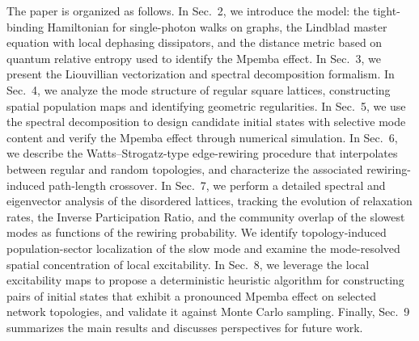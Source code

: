 \documentclass[pdflatex,sn-mathphys-num]{sn-jnl}
\renewcommand{\textcolor}[2]{#2}
\begin{document}
The paper is organized as follows.
In Sec.~2, we introduce the model: the tight-binding Hamiltonian
for single-photon walks on graphs, the Lindblad master equation
with local dephasing dissipators, and the distance metric based on
quantum relative entropy used to identify the Mpemba effect.
In Sec.~3, we present the Liouvillian vectorization and spectral
decomposition formalism.
In Sec.~4, we analyze the mode structure of regular square lattices,
constructing spatial population maps and identifying geometric
regularities.
In Sec.~5, we use the spectral decomposition to design candidate
initial states with selective mode content and verify the Mpemba
effect through numerical simulation.
In Sec.~6, we describe the Watts--Strogatz-type edge-rewiring
procedure that interpolates between regular and random topologies,
and characterize the associated rewiring-induced path-length crossover.
In Sec.~7, we perform a detailed spectral and eigenvector analysis
of the disordered lattices, tracking the evolution of relaxation rates,
the Inverse Participation Ratio, and the community overlap of the
slowest modes as functions of the rewiring probability. We identify
topology-induced population-sector localization of the slow mode and examine
the mode-resolved spatial concentration of local excitability.
In Sec.~8, we leverage the local excitability maps to propose a
deterministic heuristic algorithm for constructing pairs of initial
states that exhibit a pronounced Mpemba effect on selected network
topologies, and validate it against Monte Carlo sampling.
Finally, Sec.~9 summarizes the main results and discusses perspectives
for future work.
 



\end{document}
